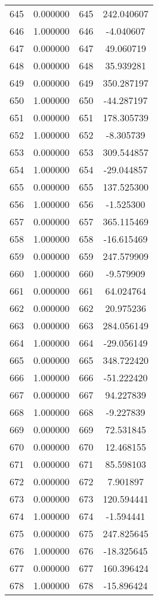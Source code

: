\documentclass[12pt]{article}
\begin{document}
\begin{longtable}{@{}cccc@{}}
645 & 0.000000 & 645 & 242.040607 \\
646 & 1.000000 & 646 & -4.040607 \\
647 & 0.000000 & 647 & 49.060719 \\
648 & 0.000000 & 648 & 35.939281 \\
649 & 0.000000 & 649 & 350.287197 \\
650 & 1.000000 & 650 & -44.287197 \\
651 & 0.000000 & 651 & 178.305739 \\
652 & 1.000000 & 652 & -8.305739 \\
653 & 0.000000 & 653 & 309.544857 \\
654 & 1.000000 & 654 & -29.044857 \\
655 & 0.000000 & 655 & 137.525300 \\
656 & 1.000000 & 656 & -1.525300 \\
657 & 0.000000 & 657 & 365.115469 \\
658 & 1.000000 & 658 & -16.615469 \\
659 & 0.000000 & 659 & 247.579909 \\
660 & 1.000000 & 660 & -9.579909 \\
661 & 0.000000 & 661 & 64.024764 \\
662 & 0.000000 & 662 & 20.975236 \\
663 & 0.000000 & 663 & 284.056149 \\
664 & 1.000000 & 664 & -29.056149 \\
665 & 0.000000 & 665 & 348.722420 \\
666 & 1.000000 & 666 & -51.222420 \\
667 & 0.000000 & 667 & 94.227839 \\
668 & 1.000000 & 668 & -9.227839 \\
669 & 0.000000 & 669 & 72.531845 \\
670 & 0.000000 & 670 & 12.468155 \\
671 & 0.000000 & 671 & 85.598103 \\
672 & 0.000000 & 672 & 7.901897 \\
673 & 0.000000 & 673 & 120.594441 \\
674 & 1.000000 & 674 & -1.594441 \\
675 & 0.000000 & 675 & 247.825645 \\
676 & 1.000000 & 676 & -18.325645 \\
677 & 0.000000 & 677 & 160.396424 \\
678 & 1.000000 & 678 & -15.896424 \\

\end{longtable}
\end{document}
